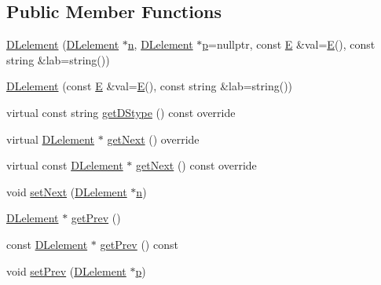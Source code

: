 \subsection*{Public Member Functions}
\begin{DoxyCompactItemize}
\item 
\mbox{\hyperlink{classbridges_1_1_d_lelement_a846424760c641ba5f496615361d8f79c}{D\+Lelement}} (\mbox{\hyperlink{classbridges_1_1_d_lelement}{D\+Lelement}} $\ast$\mbox{\hyperlink{namespacebridges_acfb0a4f7877d8f63de3e6862004c50eda7b8b965ad4bca0e41ab51de7b31363a1}{n}}, \mbox{\hyperlink{classbridges_1_1_d_lelement}{D\+Lelement}} $\ast$\mbox{\hyperlink{namespacebridges_acfb0a4f7877d8f63de3e6862004c50eda83878c91171338902e0fe0fb97a8c47a}{p}}=nullptr, const \mbox{\hyperlink{namespacebridges_acfb0a4f7877d8f63de3e6862004c50eda3a3ea00cfc35332cedf6e5e9a32e94da}{E}} \&val=\mbox{\hyperlink{namespacebridges_acfb0a4f7877d8f63de3e6862004c50eda3a3ea00cfc35332cedf6e5e9a32e94da}{E}}(), const string \&lab=string())
\item 
\mbox{\hyperlink{classbridges_1_1_d_lelement_aab0e126bc0b34815f855899b5a8fa75a}{D\+Lelement}} (const \mbox{\hyperlink{namespacebridges_acfb0a4f7877d8f63de3e6862004c50eda3a3ea00cfc35332cedf6e5e9a32e94da}{E}} \&val=\mbox{\hyperlink{namespacebridges_acfb0a4f7877d8f63de3e6862004c50eda3a3ea00cfc35332cedf6e5e9a32e94da}{E}}(), const string \&lab=string())
\item 
virtual const string \mbox{\hyperlink{classbridges_1_1_d_lelement_a109be7aba8bd3d0450859938b5d3144c}{get\+D\+Stype}} () const override
\item 
virtual \mbox{\hyperlink{classbridges_1_1_d_lelement}{D\+Lelement}} $\ast$ \mbox{\hyperlink{classbridges_1_1_d_lelement_a0c713707d8c7d0a97fe4194ed6592ede}{get\+Next}} () override
\item 
virtual const \mbox{\hyperlink{classbridges_1_1_d_lelement}{D\+Lelement}} $\ast$ \mbox{\hyperlink{classbridges_1_1_d_lelement_a648012849263b4b1cd2d504d5e5fd880}{get\+Next}} () const override
\item 
void \mbox{\hyperlink{classbridges_1_1_d_lelement_aba19c60b1d10c145b1b737f9134f4497}{set\+Next}} (\mbox{\hyperlink{classbridges_1_1_d_lelement}{D\+Lelement}} $\ast$\mbox{\hyperlink{namespacebridges_acfb0a4f7877d8f63de3e6862004c50eda7b8b965ad4bca0e41ab51de7b31363a1}{n}})
\item 
\mbox{\hyperlink{classbridges_1_1_d_lelement}{D\+Lelement}} $\ast$ \mbox{\hyperlink{classbridges_1_1_d_lelement_a5b0316fb255d022b0dc3065d681fc2a7}{get\+Prev}} ()
\item 
const \mbox{\hyperlink{classbridges_1_1_d_lelement}{D\+Lelement}} $\ast$ \mbox{\hyperlink{classbridges_1_1_d_lelement_a6b46ea401b8192e9043f0493adcec63e}{get\+Prev}} () const
\item 
void \mbox{\hyperlink{classbridges_1_1_d_lelement_af146e0e10faba6395272d5fc1560f266}{set\+Prev}} (\mbox{\hyperlink{classbridges_1_1_d_lelement}{D\+Lelement}} $\ast$\mbox{\hyperlink{namespacebridges_acfb0a4f7877d8f63de3e6862004c50eda83878c91171338902e0fe0fb97a8c47a}{p}})
\end{DoxyCompactItemize}
